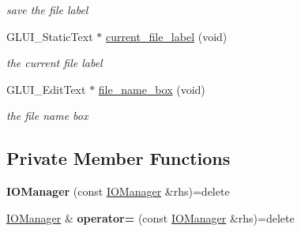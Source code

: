 \begin{DoxyCompactItemize}
\begin{DoxyCompactList}\small\item\em save the file label \end{DoxyCompactList}\item 
G\+L\+U\+I\+\_\+\+Static\+Text $\ast$ \hyperlink{classimage__tools_1_1IOManager_a21fb95777da9b6b0059fe89bbac79666}{current\+\_\+file\+\_\+label} (void)\hypertarget{classimage__tools_1_1IOManager_a21fb95777da9b6b0059fe89bbac79666}{}\label{classimage__tools_1_1IOManager_a21fb95777da9b6b0059fe89bbac79666}

\begin{DoxyCompactList}\small\item\em the current file label \end{DoxyCompactList}\item 
G\+L\+U\+I\+\_\+\+Edit\+Text $\ast$ \hyperlink{classimage__tools_1_1IOManager_a1ffebca9d8453a19a051119f3d216784}{file\+\_\+name\+\_\+box} (void)\hypertarget{classimage__tools_1_1IOManager_a1ffebca9d8453a19a051119f3d216784}{}\label{classimage__tools_1_1IOManager_a1ffebca9d8453a19a051119f3d216784}

\begin{DoxyCompactList}\small\item\em the file name box \end{DoxyCompactList}\end{DoxyCompactItemize}
\subsection*{Private Member Functions}
\begin{DoxyCompactItemize}
\item 
{\bfseries I\+O\+Manager} (const \hyperlink{classimage__tools_1_1IOManager}{I\+O\+Manager} \&rhs)=delete\hypertarget{classimage__tools_1_1IOManager_a3d4afeda268cd5f55994c5c055dcb50f}{}\label{classimage__tools_1_1IOManager_a3d4afeda268cd5f55994c5c055dcb50f}

\item 
\hyperlink{classimage__tools_1_1IOManager}{I\+O\+Manager} \& {\bfseries operator=} (const \hyperlink{classimage__tools_1_1IOManager}{I\+O\+Manager} \&rhs)=delete\hypertarget{classimage__tools_1_1IOManager_ab51c42c7007e4fa4da32a943c4beed42}{}\label{classimage__tools_1_1IOManager_ab51c42c7007e4fa4da32a943c4beed42}

\end{DoxyCompactItemize}
